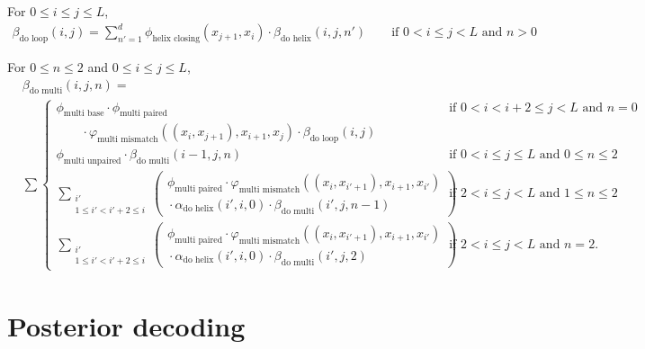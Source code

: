 \documentclass{article}
\newcommand{\multimismatch}{\varphi_\text{multi mismatch}}
\newcommand{\helixclosing}{\phi_\text{helix closing}}
\newcommand{\Bdoloop}{\beta_\text{do loop}}
\newcommand{\Bdomulti}{\beta_\text{do multi}}
\newcommand{\multibase}{\phi_\text{multi base}}
\newcommand{\multiunpaired}{\phi_\text{multi unpaired}}
\newcommand{\multipaired}{\phi_\text{multi paired}}
\newcommand{\Adohelix}{\alpha_\text{do helix}}
\newcommand{\Bdohelix}{\beta_\text{do helix}}
\begin{document}
  \noindent
  For $0 \le i \le j \le L$,
  \begin{align*}
    \Bdoloop(i,j) = \sum_{n'=1}^d \helixclosing(x_{j+1},x_i) \cdot \Bdohelix(i,j,n') \qquad \text{if $0 < i \le j < L$ and $n > 0$}
  \end{align*} 

  \noindent
  For $0 \le n \le 2$ and $0 \le i \le j \le L$,
  \begin{align*}
    &\Bdomulti(i,j,n) = \\
    &\sum \begin{cases}
      \multibase \cdot \multipaired & \text{if $0<i < i+2 \le j<L$ and $n=0$}\\
      \qquad {} \cdot \multimismatch((x_i,x_{j+1}),x_{i+1},x_j) \cdot \Bdoloop(i,j) \\
      \multiunpaired \cdot \Bdomulti(i-1,j,n) & \text{if $0 < i \le j \le L$ and $0 \le n \le 2$} \\
      \displaystyle \sum_{\substack{i' \\ 1 \le i' < i'+2 \le i}}
      \left(
      \begin{matrix}
	\multipaired \cdot \multimismatch((x_i,x_{i'+1}),x_{i+1},x_{i'}) \\
	{} \cdot \Adohelix(i',i,0) \cdot \Bdomulti(i',j,n-1)
      \end{matrix}
      \right) & \text{if $2 < i \le j < L$ and $1 \le n \le 2$} \\
      \displaystyle \sum_{\substack{i' \\ 1 \le i' < i'+2 \le i}}
      \left(
      \begin{matrix}
	\multipaired \cdot \multimismatch((x_i,x_{i'+1}),x_{i+1},x_{i'}) \\
	{} \cdot \Adohelix(i',i,0) \cdot \Bdomulti(i',j,2)
      \end{matrix}
      \right) & \text{if $2 < i \le j < L$ and $n=2$.}
    \end{cases}
  \end{align*}

  \newpage
  \section{Posterior decoding}
\end{document}
